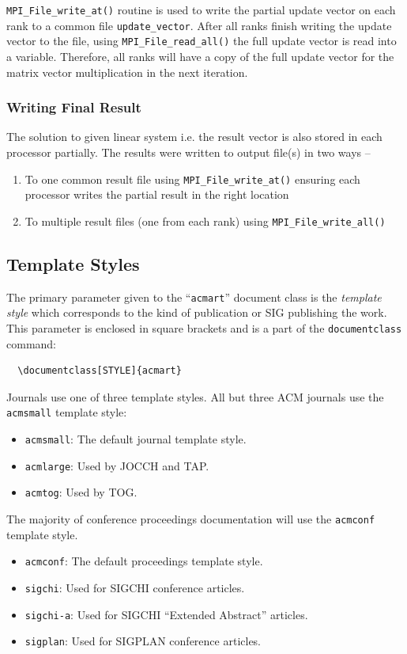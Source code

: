 \documentclass[sigplan,screen]{acmart}
\begin{document}
 \texttt{MPI\_File\_write\_at()} routine is used to write the partial update vector on each rank to a common file \texttt{update\_vector}. After all ranks finish writing the update vector to the file, using \texttt{MPI\_File\_read\_all()} the full update vector is read into a variable. Therefore, all ranks will have a copy of the full update vector for the matrix vector multiplication in the next iteration.

\subsubsection{Writing Final Result}
The solution to given linear system i.e. the result vector is also stored in each processor partially. The results were written to output file(s) in two ways -- 
\begin{enumerate}
	\item To one common result file using \texttt{MPI\_File\_write\_at()} ensuring each processor writes the partial result in the right location
	\item To multiple result files (one from each rank) using \texttt{MPI\_File\_write\_all()}
\end{enumerate}
 
\subsection{Template Styles}

The primary parameter given to the ``\verb|acmart|'' document class is
the {\itshape template style} which corresponds to the kind of publication
or SIG publishing the work. This parameter is enclosed in square
brackets and is a part of the {\verb|documentclass|} command:
\begin{verbatim}
  \documentclass[STYLE]{acmart}
\end{verbatim}

Journals use one of three template styles. All but three ACM journals
use the {\verb|acmsmall|} template style:
\begin{itemize}
\item {\verb|acmsmall|}: The default journal template style.
\item {\verb|acmlarge|}: Used by JOCCH and TAP.
\item {\verb|acmtog|}: Used by TOG.
\end{itemize}

The majority of conference proceedings documentation will use the {\verb|acmconf|} template style.
\begin{itemize}
\item {\verb|acmconf|}: The default proceedings template style.
\item{\verb|sigchi|}: Used for SIGCHI conference articles.
\item{\verb|sigchi-a|}: Used for SIGCHI ``Extended Abstract'' articles.
\item{\verb|sigplan|}: Used for SIGPLAN conference articles.
\end{itemize}
\end{document}
